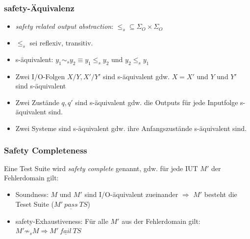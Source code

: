 \documentclass[10pt]{beamer}
\begin{document}
\begin{frame}
\frametitle{safety-Äquivalenz}
\begin{itemize}
  \item<1-> \emph{safety related output abstraction}: $\leq_s \subseteq \Sigma_O \times \Sigma_O$
  \item<2-> $\leq_s$ sei reflexiv, transitiv.
  \item<3-> s-äquivalent: $y_1 \sim_s y_2 \equiv y_1 \leq_s y_2$ und $y_2 \leq_s y_1$
  \item<4-> Zwei I/O-Folgen $X/Y, X'/Y'$ sind s-äquivalent gdw. $X=X'$ und $Y$ und $Y'$ sind s-äquivalent
  \item<5-> Zwei Zustände $q, q'$ sind s-äquivalent gdw. die Outputs für jede Inputfolge s-äquivalent sind.
  \item<6-> Zwei Systeme sind s-äquivalent gdw. ihre Anfangszustände s-äquivalent sind.
\end{itemize}
\end{frame}

\begin{frame}
\frametitle{Safety Completeness}
Eine Test Suite wird \emph{safety complete} genannt, gdw. für jede IUT $M'$ der Fehlerdomain gilt:
\begin{itemize}
  \item<1-> Soundness: $M$ und $M'$ sind I/O-äquivalent zueinander $\Rightarrow$ $M'$ besteht die Teset Suite ($M'~ \underline{pass}~ TS$)
  \item<2-> safety-Exhaustiveness: Für alle $M'$ aus der Fehlerdomain gilt: $M' \not \sim_s M \Rightarrow M'~ \underline{fail}~ TS$
\end{itemize}
\end{frame}
\end{document}
